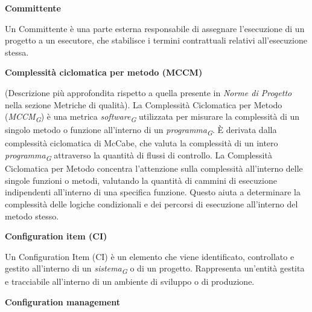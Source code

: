 \documentclass{article}
\begin{document}
\vspace{0.4cm}

\textbf{Committente}

\vspace{0.1cm}

Un Committente è una parte esterna responsabile di assegnare l'esecuzione di un progetto a un esecutore, che stabilisce i termini contrattuali relativi all'esecuzione stessa.

\vspace{0.4cm}

\textbf{Complessità ciclomatica per metodo (MCCM)}

\vspace{0.1cm}

(Descrizione più approfondita rispetto a quella presente in \textit{Norme di Progetto} nella sezione Metriche di qualità). La Complessità Ciclomatica per Metodo (\textit{MCCM}\textsubscript{\textit{G}}) è una metrica \textit{software}\textsubscript{\textit{G}} utilizzata per misurare la complessità di un singolo metodo o funzione all'interno di un \textit{programma}\textsubscript{\textit{G}}. È derivata dalla complessità ciclomatica di McCabe, che valuta la complessità di un intero \textit{programma}\textsubscript{\textit{G}} attraverso la quantità di flussi di controllo.
La Complessità Ciclomatica per Metodo concentra l'attenzione sulla complessità all'interno delle singole funzioni o metodi, valutando la quantità di cammini di esecuzione indipendenti all'interno di una specifica funzione. Questo aiuta a determinare la complessità delle logiche condizionali e dei percorsi di esecuzione all'interno del metodo stesso.

\vspace{0.4cm}

\textbf{Configuration item (CI)}

\vspace{0.1cm}

Un Configuration Item (CI) è un elemento che viene identificato, controllato e gestito all'interno di un \textit{sistema}\textsubscript{\textit{G}} o di un progetto. Rappresenta un'entità gestita e tracciabile all'interno di un ambiente di sviluppo o di produzione.

\vspace{0.4cm}

\textbf{Configuration management}

\vspace{0.1cm}
\end{document}
